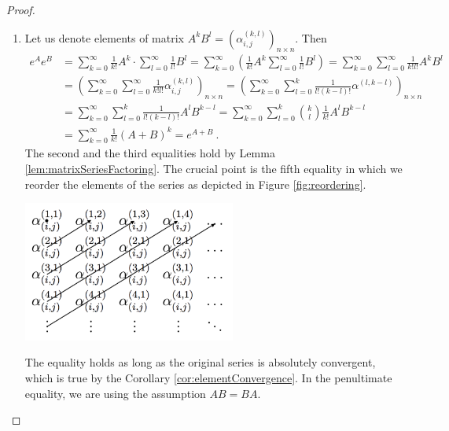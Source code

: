\begin{proof}
\begin{enumerate}
		\item Let us denote elements of matrix $A^kB^l=(\alpha^{(k,l)}_{i,j})_{n\times n}$. Then
		\begin{align*}
			e^{A}e^{B}
			&=\sum^\infty_{k=0}\frac{1}{k!}A^{k}\cdot\sum^\infty_{l=0}\frac{1}{l!}B^{l}
			=\sum^\infty_{k=0}\left(\frac{1}{k!}A^{k}\sum^\infty_{l=0}\frac{1}{l!}B^{l}\right)
			=\sum^\infty_{k=0}\sum^\infty_{l=0}\frac{1}{k!l!}A^kB^l
			\\
			&=\left(\sum^\infty_{k=0}\sum^\infty_{l=0}\frac{1}{k!l!}\alpha^{(k,l)}_{i,j}\right)_{n\times n}
			=\left(\sum^\infty_{k=0}\sum^k_{l=0}\frac{1}{l!(k-l)!}\alpha^{(l,k-l)}\right)_{n\times n}
			\\
			&=\sum^\infty_{k=0}\sum^k_{l=0}\frac{1}{l!(k-l)!}A^{l}B^{k-l}
			=\sum^\infty_{k=0}\sum^k_{l=0}\binom{k}{l}\frac{1}{k!}A^{l}B^{k-l}
			\\
			&=\sum^\infty_{k=0}\frac{1}{k!}(A+B)^{k}
			=e^{A+B}\ .
		\end{align*}
		The second and the third equalities hold by Lemma \ref{lem:matrixSeriesFactoring}. The crucial point is the fifth equality in which we reorder the elements of the series as depicted in Figure \ref{fig:reordering}. 
		\begin{center}
			\includegraphics[width=70mm]{reordering.pdf}
			\label{fig:reordering}
		\end{center}
		The equality holds as long as the original series is absolutely convergent, which is true by the Corollary \ref{cor:elementConvergence}. In the penultimate equality, we are using the assumption $AB=BA$. 
	\end{enumerate}
\end{proof}

